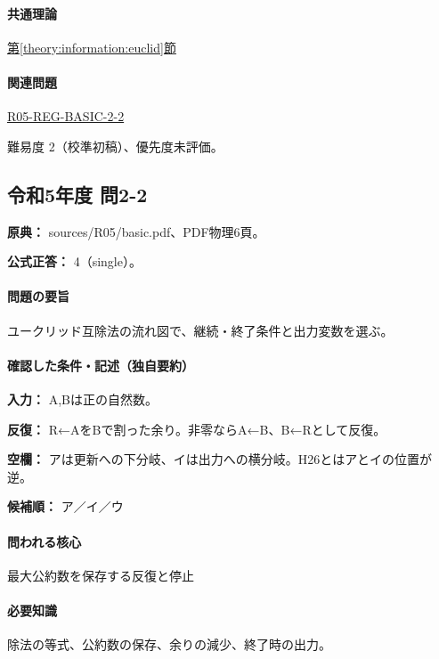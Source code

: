 \paragraph{共通理論} \hyperref[theory:information:euclid]{第\ref*{theory:information:euclid}節}

\paragraph{関連問題} \hyperref[q:r05-reg-basic-2-2]{R05-REG-BASIC-2-2}

\par 難易度 2（校準初稿）、優先度未評価。

\subsection{令和5年度 問2-2}
\label{q:r05-reg-basic-2-2}

\noindent\textbf{原典：} sources/R05/basic.pdf、PDF物理6頁。

\textbf{公式正答：} 4（single）。

\paragraph{問題の要旨} ユークリッド互除法の流れ図で、継続・終了条件と出力変数を選ぶ。

\paragraph{確認した条件・記述（独自要約）}\mbox{}\par

\noindent\textbf{入力：} A,Bは正の自然数。\par

\noindent\textbf{反復：} R←AをBで割った余り。非零ならA←B、B←Rとして反復。\par

\noindent\textbf{空欄：} アは更新への下分岐、イは出力への横分岐。H26とはアとイの位置が逆。\par

\noindent\textbf{候補順：} ア／イ／ウ\par

\paragraph{問われる核心} 最大公約数を保存する反復と停止

\paragraph{必要知識} 除法の等式、公約数の保存、余りの減少、終了時の出力。

